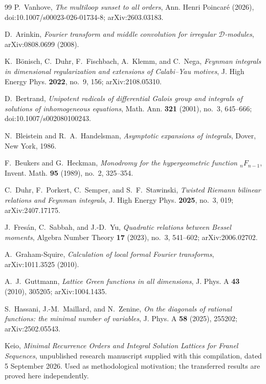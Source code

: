 \documentclass[11pt,a4paper]{article}
\theoremstyle{definition}
\theoremstyle{remark}
\numberwithin{equation}{section}
\begin{document}
\begin{thebibliography}{99}
P.~Vanhove,
\emph{The multiloop sunset to all orders},
Ann. Henri Poincar\'e (2026), doi:10.1007/s00023-026-01734-8; arXiv:2603.03183.

D.~Arinkin,
\emph{Fourier transform and middle convolution for irregular $\mathcal D$-modules},
arXiv:0808.0699 (2008).

K.~B\"onisch, C.~Duhr, F.~Fischbach, A.~Klemm, and C.~Nega,
\emph{Feynman integrals in dimensional regularization and extensions of Calabi--Yau motives},
J. High Energy Phys. \textbf{2022}, no.~9, 156; arXiv:2108.05310.

D.~Bertrand,
\emph{Unipotent radicals of differential Galois group and integrals of solutions of inhomogeneous equations},
Math. Ann. \textbf{321} (2001), no.~3, 645--666; doi:10.1007/s002080100243.

N.~Bleistein and R.~A.~Handelsman,
\emph{Asymptotic expansions of integrals},
Dover, New York, 1986.

F.~Beukers and G.~Heckman,
\emph{Monodromy for the hypergeometric function ${}_nF_{n-1}$},
Invent. Math. \textbf{95} (1989), no.~2, 325--354.

C.~Duhr, F.~Porkert, C.~Semper, and S.~F.~Stawinski,
\emph{Twisted Riemann bilinear relations and Feynman integrals},
J. High Energy Phys. \textbf{2025}, no.~3, 019; arXiv:2407.17175.

J.~Fres\'an, C.~Sabbah, and J.-D.~Yu,
\emph{Quadratic relations between Bessel moments},
Algebra Number Theory \textbf{17} (2023), no.~3, 541--602; arXiv:2006.02702.

A.~Graham-Squire,
\emph{Calculation of local formal Fourier transforms},
arXiv:1011.3525 (2010).

A.~J.~Guttmann,
\emph{Lattice Green functions in all dimensions},
J. Phys. A \textbf{43} (2010), 305205; arXiv:1004.1435.

S.~Hassani, J.-M.~Maillard, and N.~Zenine,
\emph{On the diagonals of rational functions: the minimal number of variables},
J. Phys. A \textbf{58} (2025), 255202; arXiv:2502.05543.

Keio,
\emph{Minimal Recurrence Orders and Integral Solution Lattices for Franel Sequences},
unpublished research manuscript supplied with this compilation, dated 5 September 2026.
Used as methodological motivation; the transferred results are proved here independently.

\end{thebibliography}
\end{document}
